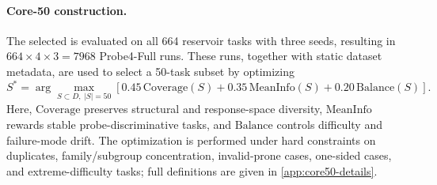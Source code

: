 
\paragraph{Core-50 construction.}
The selected \probe{} is evaluated on all 664 reservoir tasks with three seeds, resulting in \(664 \times 4 \times 3 = 7968\) Probe4-Full runs. These runs, together with static dataset metadata, are used to select a 50-task subset by optimizing
\[
S^*
=
\arg\max_{S\subset D,\ |S|=50}
\left[
0.45\,\mathrm{Coverage}(S)
+
0.35\,\mathrm{MeanInfo}(S)
+
0.20\,\mathrm{Balance}(S)
\right].
\]
Here, \(\mathrm{Coverage}\) preserves structural and response-space diversity, \(\mathrm{MeanInfo}\) rewards stable probe-discriminative tasks, and \(\mathrm{Balance}\) controls difficulty and failure-mode drift. The optimization is performed under hard constraints on duplicates, family/subgroup concentration, invalid-prone cases, one-sided cases, and extreme-difficulty tasks; full definitions are given in \cref{app:core50-details}.

